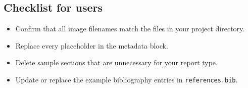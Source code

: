 \documentclass[11pt,letterpaper]{article}
\begin{document}
\subsection{Checklist for users}
\begin{itemize}[leftmargin=1.5em]
    \item Confirm that all image filenames match the files in your project directory.
    \item Replace every placeholder in the metadata block.
    \item Delete sample sections that are unnecessary for your report type.
    \item Update or replace the example bibliography entries in \texttt{references.bib}.
\end{itemize}
\end{document}
